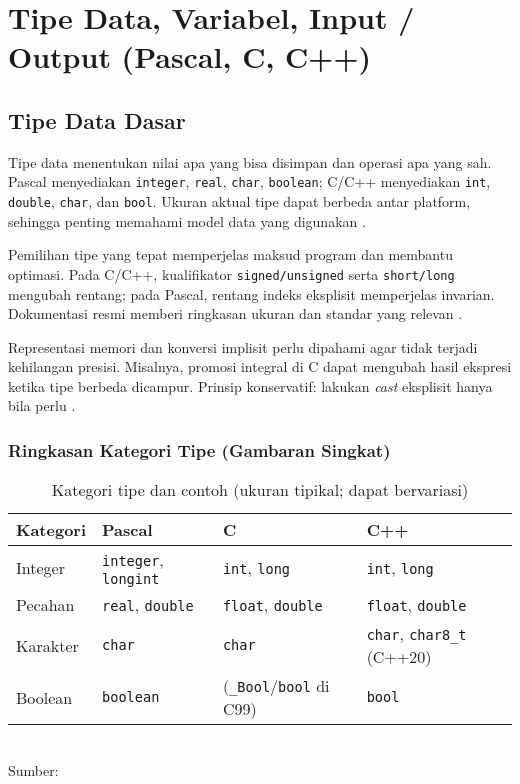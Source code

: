 \documentclass[../main.tex]{subfiles}
\begin{document}
\chapter{Tipe Data, Variabel, Input / Output (Pascal, C, C++)}
\section{Tipe Data Dasar}
Tipe data menentukan nilai apa yang bisa disimpan dan operasi apa yang sah. Pascal menyediakan \texttt{integer}, \texttt{real}, \texttt{char}, \texttt{boolean}; C/C++ menyediakan \texttt{int}, \texttt{double}, \texttt{char}, dan \texttt{bool}. Ukuran aktual tipe dapat berbeda antar platform, sehingga penting memahami model data yang digunakan \parencite{pascal-tutorial-wikibooks,iso-c-draft-n1570,cpp-arithmetic-types,cpp-fundamental-types}.

Pemilihan tipe yang tepat memperjelas maksud program dan membantu optimasi. Pada C/C++, kualifikator \texttt{signed/unsigned} serta \texttt{short/long} mengubah rentang; pada Pascal, rentang indeks eksplisit memperjelas invarian. Dokumentasi resmi memberi ringkasan ukuran dan standar yang relevan \parencite{free-pascal-docs,iso-c-draft-n1570,cpp-reference}.

Representasi memori dan konversi implisit perlu dipahami agar tidak terjadi kehilangan presisi. Misalnya, promosi integral di C dapat mengubah hasil ekspresi ketika tipe berbeda dicampur. Prinsip konservatif: lakukan \emph{cast} eksplisit hanya bila perlu \parencite{gnu-c-manual,cpp-reference}.

\subsection{Ringkasan Kategori Tipe (Gambaran Singkat)}
\begin{table}[h]
  \centering
  \caption{Kategori tipe dan contoh (ukuran tipikal; dapat bervariasi)}
  \begin{tabular}{@{}llll@{}}
    \toprule
    Kategori & Pascal & C & C++ \\
    \midrule
    Integer & \texttt{integer}, \texttt{longint} & \texttt{int}, \texttt{long} & \texttt{int}, \texttt{long} \\
    Pecahan & \texttt{real}, \texttt{double} & \texttt{float}, \texttt{double} & \texttt{float}, \texttt{double} \\
    Karakter & \texttt{char} & \texttt{char} & \texttt{char}, \texttt{char8\_t} (C++20) \\
    Boolean & \texttt{boolean} & (\texttt{_Bool}/\texttt{bool} di C99) & \texttt{bool} \\
    \bottomrule
  \end{tabular}
  \\Sumber: \parencite{free-pascal-docs,iso-c-draft-n1570,cpp-fundamental-types}
\end{table}
\end{document}

